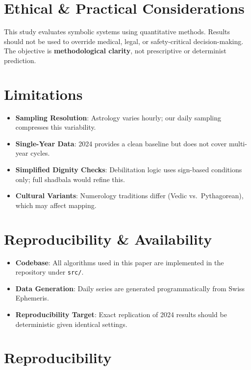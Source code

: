 \documentclass[
  11pt,
  a4paper,
  oneside,
  openany]{article}
\providecommand{\tightlist}{%
  \setlength{\itemsep}{0pt}\setlength{\parskip}{0pt}}\usepackage{longtable,booktabs,array}
\begin{document}
\section{Ethical \& Practical
Considerations}\label{ethical-practical-considerations}

This study evaluates symbolic systems using quantitative methods.
Results should not be used to override medical, legal, or
safety-critical decision-making. The objective is \textbf{methodological
clarity}, not prescriptive or determinist prediction.

\section{Limitations}\label{limitations}

\begin{itemize}
\tightlist
\item
  \textbf{Sampling Resolution}: Astrology varies hourly; our daily
  sampling compresses this variability.
\item
  \textbf{Single-Year Data}: 2024 provides a clean baseline but does not
  cover multi-year cycles.
\item
  \textbf{Simplified Dignity Checks}: Debilitation logic uses sign-based
  conditions only; full shadbala would refine this.
\item
  \textbf{Cultural Variants}: Numerology traditions differ (Vedic
  vs.~Pythagorean), which may affect mapping.
\end{itemize}

\section{Reproducibility \&
Availability}\label{reproducibility-availability}

\begin{itemize}
\tightlist
\item
  \textbf{Codebase}: All algorithms used in this paper are implemented
  in the repository under \texttt{src/}.
\item
  \textbf{Data Generation}: Daily series are generated programmatically
  from Swiss Ephemeris.
\item
  \textbf{Reproducibility Target}: Exact replication of 2024 results
  should be deterministic given identical settings.
\end{itemize}

\FloatBarrier

\section{Reproducibility}\label{reproducibility}
\end{document}
